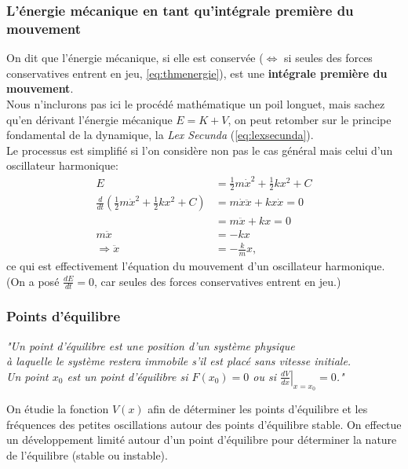 \documentclass{article}
\numberwithin{equation}{section}
\begin{document}
\subsubsection{L'énergie mécanique en tant qu'intégrale première du mouvement}
On dit que l'énergie mécanique, si elle est conservée (\(\Leftrightarrow\) si seules des forces conservatives entrent en jeu, \ref{eq:thmenergie}), est une \textbf{intégrale première du mouvement}. \\

Nous n'inclurons pas ici le procédé mathématique un poil longuet, mais sachez qu'en dérivant l'énergie mécanique \(E = K + V\), on peut retomber sur le principe fondamental de la dynamique, la \emph{Lex Secunda} (\ref{eq:lexsecunda}). \\
Le processus est simplifié si l'on considère non pas le cas général mais celui d'un oscillateur harmonique:
\begin{align*}
	E &= \frac{1}{2} m \dot x^2 + \frac{1}{2} k x^2 + C \\
	\frac{d}{dt}\left ( \frac{1}{2} m \dot x^2 + \frac{1}{2} k x^2 + C \right ) &= m \dot x \ddot x + k x \dot x = 0 \\
	&= m \ddot x + k x = 0 \\
	m \ddot x &= -k x \\
	\Rightarrow \ddot x &= -\frac{k}{m} x,
\end{align*}
ce qui est effectivement l'équation du mouvement d'un oscillateur harmonique. \\
(On a posé \(\frac{dE}{dt} = 0\), car seules des forces conservatives entrent en jeu.)

\subsubsection{Points d'équilibre}
\begin{center}
	\emph{"Un point d'équilibre est une position d'un système physique \\ à laquelle le système restera immobile s'il est placé sans vitesse initiale. \\ Un point \(x_0\) est un point d'équilibre si \(F(x_0) = 0\) ou si \(\left . \frac{dV}{dx} \right \rvert_{x=x_0} = 0\)."} %
\end{center}
On étudie la fonction \(V(x)\) afin de déterminer les points d'équilibre et les fréquences des petites oscillations autour des points d'équilibre stable. On effectue un développement limité autour d'un point d'équilibre pour déterminer la nature de l'équilibre (stable ou instable).
\end{document}

